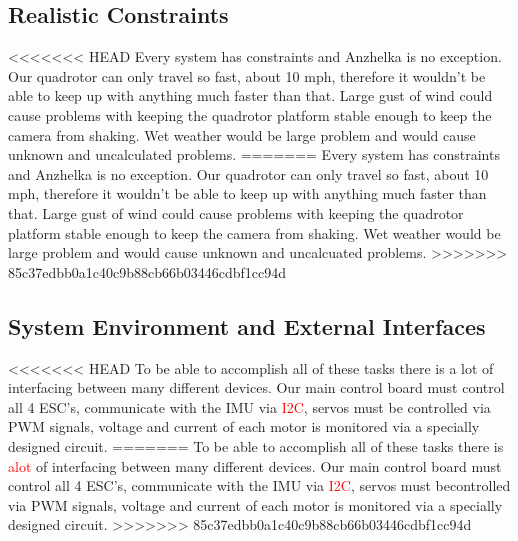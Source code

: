 \documentclass{article}
\numberwithin{equation}{section} %
\begin{document}
\subsection{Realistic Constraints}
<<<<<<< HEAD
Every system has constraints and Anzhelka is no exception. Our quadrotor can only travel so fast, about 10 mph, therefore it wouldn't be able to keep up with anything much faster than that. Large gust of wind could cause problems with keeping the quadrotor platform stable enough to keep the camera from shaking. Wet weather would be large problem and would cause unknown and uncalculated problems.
=======
Every system has constraints and Anzhelka is no exception. Our quadrotor can only travel so fast, about 10 mph, therefore it wouldn't be able to keep up with anything much faster than that. Large gust of wind could cause problems with keeping the quadrotor platform stable enough to keep the camera from shaking. Wet weather would be large problem and would cause unknown and uncalcuated problems.
>>>>>>> 85c37edbb0a1c40c9b88cb66b03446cdbf1cc94d

\subsection{System Environment and External Interfaces}
<<<<<<< HEAD
To be able to accomplish all of these tasks there is a lot of interfacing between many different devices. Our main control board must control all 4 ESC's, communicate with the IMU via \textcolor{red}{I2C}, servos must be controlled via PWM signals, voltage and current of each motor is monitored via a specially designed circuit.
=======
To be able to accomplish all of these tasks there is \textcolor{red}{alot} of interfacing between many different devices. Our main control board must control all 4 ESC's, communicate with the IMU via \textcolor{red}{I2C}, servos must becontrolled via PWM signals, voltage and current of each motor is monitored via a specially designed circuit.
>>>>>>> 85c37edbb0a1c40c9b88cb66b03446cdbf1cc94d

\end{document}

